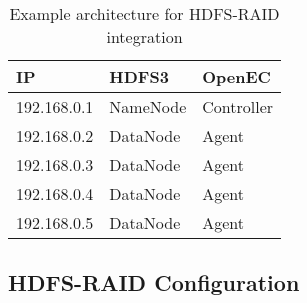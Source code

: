 \documentclass[letterpaper,12pt]{article}
\newcommand{\openec}{{\sf\small OpenEC}\xspace}
\begin{document}
\begin{table}[h]
\centering
\footnotesize
\renewcommand{\arraystretch}{1.1}
\begin{tabular}{|l|l|l|}
\hline
IP & HDFS3 & OpenEC \\
\hline
\hline
192.168.0.1 & NameNode & Controller \\
\hline
192.168.0.2 & DataNode & Agent \\
\hline
192.168.0.3 & DataNode & Agent \\
\hline
192.168.0.4 & DataNode & Agent \\
\hline
192.168.0.5 & DataNode & Agent \\
\hline
\end{tabular}
\vspace{-3pt}
\caption{Example architecture for HDFS-RAID integration}
\label{tab:hdfsraidarch}
\end{table}

\subsection{HDFS-RAID Configuration}

\end{document}
